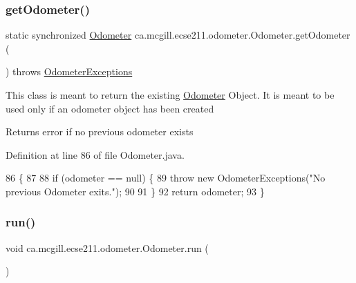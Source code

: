 \subsubsection{\texorpdfstring{get\+Odometer()}{getOdometer()}\hspace{0.1cm}{\footnotesize\ttfamily [2/2]}}
{\footnotesize\ttfamily static synchronized \hyperlink{classca_1_1mcgill_1_1ecse211_1_1odometer_1_1_odometer}{Odometer} ca.\+mcgill.\+ecse211.\+odometer.\+Odometer.\+get\+Odometer (\begin{DoxyParamCaption}{ }\end{DoxyParamCaption}) throws \hyperlink{classca_1_1mcgill_1_1ecse211_1_1odometer_1_1_odometer_exceptions}{Odometer\+Exceptions}\hspace{0.3cm}{\ttfamily [static]}}

This class is meant to return the existing \hyperlink{classca_1_1mcgill_1_1ecse211_1_1odometer_1_1_odometer}{Odometer} Object. It is meant to be used only if an odometer object has been created

\begin{DoxyReturn}{Returns}
error if no previous odometer exists 
\end{DoxyReturn}


Definition at line 86 of file Odometer.\+java.


\begin{DoxyCode}
86                                                                               \{
87 
88     \textcolor{keywordflow}{if} (odometer == null) \{
89       \textcolor{keywordflow}{throw} \textcolor{keyword}{new} OdometerExceptions(\textcolor{stringliteral}{"No previous Odometer exits."});
90 
91     \}
92     \textcolor{keywordflow}{return} odometer;
93   \}
\end{DoxyCode}
\mbox{\label{classca_1_1mcgill_1_1ecse211_1_1odometer_1_1_odometer_af0ff4c5121973a8310cf986e25fa0d87}} 
\subsubsection{\texorpdfstring{run()}{run()}}
{\footnotesize\ttfamily void ca.\+mcgill.\+ecse211.\+odometer.\+Odometer.\+run (\begin{DoxyParamCaption}{ }\end{DoxyParamCaption})}


